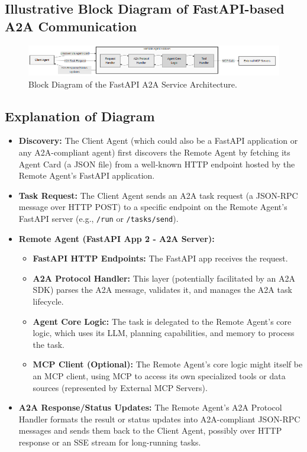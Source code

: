 \subsection*{Illustrative Block Diagram of FastAPI-based A2A Communication}
\begin{figure}[htbp]
    \centering
    \includegraphics[width=\textwidth]{diagrams/mcp_a2a.png}
    \caption{Block Diagram of the FastAPI A2A Service Architecture.}
    \label{fig:mcp_a2a_diagram}
\end{figure}

\subsection*{Explanation of Diagram}
\begin{itemize}
    \item \textbf{Discovery:} The Client Agent (which could also be a FastAPI application or any A2A-compliant agent) first discovers
     the Remote Agent by fetching its Agent Card (a JSON file) from a well-known HTTP endpoint hosted by the Remote Agent's FastAPI application.
    \item \textbf{Task Request:} The Client Agent sends an A2A task request (a JSON-RPC message over HTTP POST) to a specific endpoint on 
    the Remote Agent's FastAPI server (e.g., \texttt{/run} or \texttt{/tasks/send}).
    \item \textbf{Remote Agent (FastAPI App 2 - A2A Server):}
    \begin{itemize}
        \item \textbf{FastAPI HTTP Endpoints:} The FastAPI app receives the request.
        \item \textbf{A2A Protocol Handler:} This layer (potentially facilitated by an A2A SDK) parses the A2A message, validates it, and 
        manages the A2A task lifecycle.
        \item \textbf{Agent Core Logic:} The task is delegated to the Remote Agent's core logic, which uses its LLM, planning capabilities, 
        and memory to process the task.
        \item \textbf{MCP Client (Optional):} The Remote Agent's core logic might itself be an MCP client, using MCP to access its 
        own specialized tools or data sources (represented by External MCP Servers).
    \end{itemize}
    \item \textbf{A2A Response/Status Updates:} The Remote Agent's A2A Protocol Handler formats the result or status updates into 
    A2A-compliant JSON-RPC messages and sends them back to the Client Agent, possibly over HTTP response or an SSE stream for long-running tasks.
\end{itemize}
